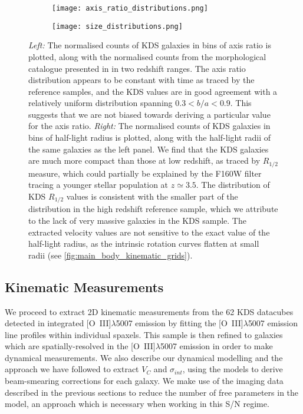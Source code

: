 \documentclass[fleqn,usenatbib]{mn2e}
\begin{document}
\begin{figure*}
    \centering \hspace{-2.0cm}
    \begin{subfigure}[h!]{0.50\textwidth}
        \centering
        \texttt{[image: axis\_ratio\_distributions.png]}
    \end{subfigure} \hspace{0.4cm}
    \begin{subfigure}[h!]{0.50\textwidth}
        \centering
        \texttt{[image: size\_distributions.png]}
    \end{subfigure}
    \caption{{\it Left:} The normalised counts of KDS galaxies in bins of axis ratio is plotted, along with the normalised counts from the morphological catalogue presented in \protect\cite{VanderWel2012} in two redshift ranges.
    The axis ratio distribution appears to be constant with time as traced by the reference samples, and the KDS values are in good agreement with a relatively uniform distribution spanning $0.3 < b/a < 0.9$.
    This suggests that we are not biased towards deriving a particular value for the axis ratio.
    {\it Right:} The normalised counts of KDS galaxies in bins of half-light radius is plotted, along with the half-light radii of the same \protect\cite{VanderWel2012} galaxies as the left panel.
    We find that the KDS galaxies are much more compact than those at low redshift, as traced by $R_{1/2}$ measure, which could partially be explained by the F160W filter tracing a younger stellar population at $z\simeq3.5$.
    The distribution of KDS $R_{1/2}$ values is consistent with the smaller part of the distribution in the high redshift reference sample, which we attribute to the lack of very massive galaxies in the KDS sample.
    The extracted velocity values are not sensitive to the exact value of the half-light radius, as the intrinsic rotation curves flatten at small radii (see \protect\ref{fig:main_body_kinematic_grids}).}
    \label{fig:morpho-distributions}
\end{figure*}

\subsection{Kinematic Measurements}\label{subsection:kinematic_measurements}

We proceed to extract 2D kinematic measurements from the 62 KDS datacubes detected in integrated [O~{\sc III}]$\lambda$5007 emission by fitting the [O~{\sc III}]$\lambda$5007 emission line profiles within individual spaxels.
This sample is then refined to galaxies which are spatially-resolved in the [O~{\sc III}]$\lambda$5007 emission in order to make dynamical measurements.
We also describe our dynamical modelling and the approach we have followed to extract $V_{C}$ and $\sigma_{int}$, using the models to derive beam-smearing corrections for each galaxy.
We make use of the imaging data described in the previous sections to reduce the number of free parameters in the model, an approach which is necessary when working in this S/N regime.  
\end{document}
